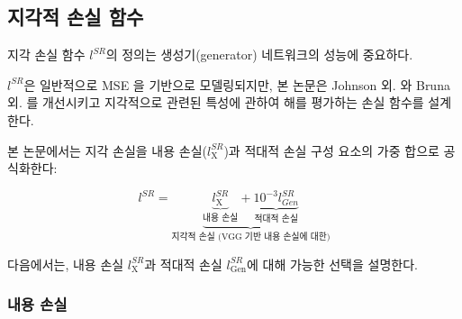 \documentclass[10pt,twocolumn,letterpaper]{article}
\newcommand{\kor}[1]{#1}
\newcommand{\eng}[1]{}
\newcommand{\summary}[1]{}
\begin{document}
\subsection{\eng{Perceptual loss function}\kor{지각적 손실 함수}}
\label{sec:losses}
\eng{
The definition of our perceptual loss function $l^{SR}$  is critical for the performance of our generator network.
}\kor{
지각 손실 함수 $l^{SR}$의 정의는 생성기(generator) 네트워크의 성능에 중요하다.
} \eng{
While $l^{SR}$ is commonly modeled based on the \ac{MSE}  \cite{dong2016image,Shi2016ESPCN}, we improve on Johnson et al. \cite{Johnson16PercepLoss} and Bruna et al. \cite{bruna2016super} and design a loss function that assesses a solution with respect to perceptually relevant characteristics.
}\kor{
$l^{SR}$은 일반적으로 \ac{MSE} \cite{dong2016image,Shi2016ESPCN}을 기반으로 모델링되지만, 본 논문은 Johnson 외. \cite{Johnson16PercepLoss}와 Bruna 외. 를 개선시키고 지각적으로 관련된 특성에 관하여 해를 평가하는 손실 함수를 설계한다.
} \eng{
We formulate the perceptual loss as the weighted sum of a content loss ($l^{SR}_\textrm{X}$) and an adversarial loss component as:
}\kor{
본 논문에서는 지각 손실을 내용 손실($l^{SR}_\textrm{X}$)과 적대적 손실 구성 요소의 가중 합으로 공식화한다:
}

\begin{equation}
l^{SR} = \underbrace{\underbrace{l^{SR}_\textrm{X}}_{\text{\eng{content loss}\kor{내용 손실}}} + \underbrace{10^{-3} l^{SR}_{Gen}}_{\text{\eng{adversarial loss}\kor{적대적 손실}}}}_{\text{\eng{perceptual loss (for VGG based content losses)}\kor{지각적 손실 (VGG 기반 내용 손실에 대한)}}}
\end{equation}

\summary{
내용 손실과 적대적 손실의 가중 합으로 구성된 본 논문의 지각 손실 함수 $l^{SR}$
}

\eng{
In the following we describe possible choices for the content loss $l^{SR}_\textrm{X}$ and the adversarial loss $l^{SR}_\textrm{Gen}$.
}\kor{
다음에서는, 내용 손실 $l^{SR}_\textrm{X}$과 적대적 손실 $l^{SR}_\textrm{Gen}$에 대해 가능한 선택을 설명한다.
}

\summary{
내용 손실과 적대적 손실에 대한 설명 제시
}

\subsubsection{\eng{Content loss}\kor{내용 손실}}
\end{document}
